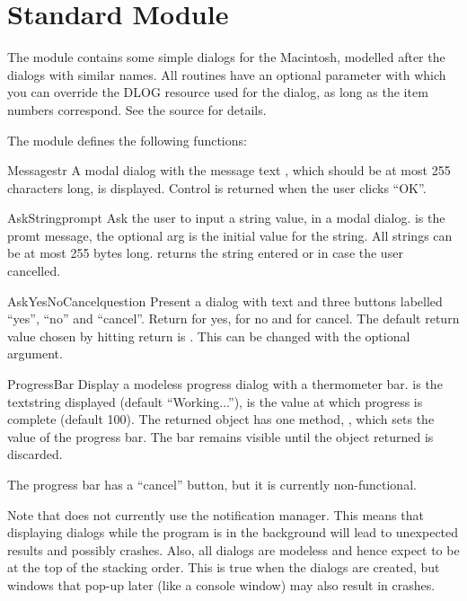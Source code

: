 \section{Standard Module }
\label{module-EasyDialogs}

The  module contains some simple dialogs for
the Macintosh, modelled after the  dialogs with similar
names. All routines have an optional parameter  with which you
can override the DLOG resource used for the dialog, as long as the
item numbers correspond. See the source for details.

The  module defines the following functions:


\begin{funcdesc}{Message}{str}
A modal dialog with the message text , which should be at
most 255 characters long, is displayed. Control is returned when the
user clicks ``OK''.
\end{funcdesc}

\begin{funcdesc}{AskString}{prompt}
Ask the user to input a string value, in a modal dialog. 
is the promt message, the optional  arg is the initial
value for the string. All strings can be at most 255 bytes
long.  returns the string entered or  in
case the user cancelled.
\end{funcdesc}

\begin{funcdesc}{AskYesNoCancel}{question}
Present a dialog with text  and three buttons labelled
``yes'', ``no'' and ``cancel''. Return  for yes,  for
no and  for cancel. The default return value chosen by
hitting return is . This can be changed with the optional
 argument.
\end{funcdesc}

\begin{funcdesc}{ProgressBar}{}
Display a modeless progress dialog with a thermometer bar. 
is the textstring displayed (default ``Working...''),  is
the value at which progress is complete (default 100). The returned
object has one method, , which sets the value of the
progress bar. The bar remains visible until the object returned is
discarded.

The progress bar has a ``cancel'' button, but it is currently
non-functional.
\end{funcdesc}

Note that  does not currently use the notification
manager. This means that displaying dialogs while the program is in
the background will lead to unexpected results and possibly
crashes. Also, all dialogs are modeless and hence expect to be at the
top of the stacking order. This is true when the dialogs are created,
but windows that pop-up later (like a console window) may also result
in crashes.
